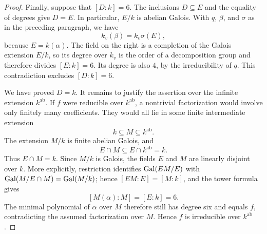 \begin{proof}
Finally, suppose that $[D:k]=6$.  The inclusions $D\subseteq E$ and
the equality of degrees give $D=E$.  In particular, $E/k$ is abelian
Galois.  With $q$, $\beta$, and $\sigma$ as in the preceding paragraph,
we have
\[
 k_v(\beta)=k_v\sigma(E),
\]
because $E=k(\alpha)$.  The field on the right is a completion of the
Galois extension $E/k$, so its degree over $k_v$ is the order of a
decomposition group and therefore divides $[E:k]=6$.  Its degree is
also $4$, by the irreducibility of $q$.  This contradiction excludes
$[D:k]=6$.

We have proved $D=k$.  It remains to justify the assertion over the
infinite extension $k^{\mathrm{ab}}$.  If $f$ were reducible over
$k^{\mathrm{ab}}$, a nontrivial factorization would involve only
finitely many coefficients.  They would all lie in some finite
intermediate extension
\[
 k\subseteq M\subseteq k^{\mathrm{ab}}.
\]
The extension $M/k$ is finite abelian Galois, and
\[
 E\cap M\subseteq E\cap k^{\mathrm{ab}}=k.
\]
Thus $E\cap M=k$.  Since $M/k$ is Galois, the fields $E$ and $M$ are
linearly disjoint over $k$.  More explicitly, restriction identifies
$\operatorname{Gal}(EM/E)$ with $\operatorname{Gal}(M/E\cap M)=\operatorname{Gal}(M/k)$; hence
$[EM:E]=[M:k]$, and the tower formula gives
\[
 [M(\alpha):M]=[E:k]=6.
\]
The minimal polynomial of $\alpha$ over $M$ therefore still has degree
six and equals $f$, contradicting the assumed factorization over $M$.
Hence $f$ is irreducible over $k^{\mathrm{ab}}$.
\end{proof}
